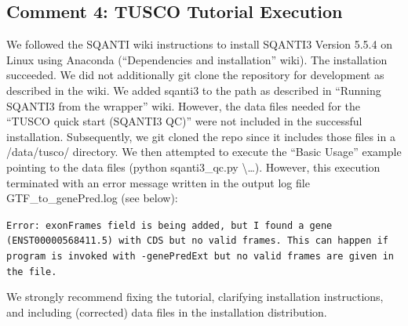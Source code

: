 \documentclass[11pt]{article}
\begin{document}
\subsection{Comment 4: TUSCO Tutorial Execution}

\begin{reviewercomment}
We followed the SQANTI wiki instructions to install SQANTI3 Version 5.5.4 on Linux using Anaconda (``Dependencies and installation'' wiki). The installation succeeded. We did not additionally git clone the repository for development as described in the wiki. We added sqanti3 to the path as described in ``Running SQANTI3 from the wrapper'' wiki. However, the data files needed for the ``TUSCO quick start (SQANTI3 QC)'' were not included in the successful installation. Subsequently, we git cloned the repo since it includes those files in a /data/tusco/ directory. We then attempted to execute the ``Basic Usage'' example pointing to the data files (python sqanti3\_qc.py \textbackslash{}\ldots). However, this execution terminated with an error message written in the output log file GTF\_to\_genePred.log (see below):

\smallskip
\texttt{Error: exonFrames field is being added, but I found a gene (ENST00000568411.5) with CDS but no valid frames. This can happen if program is invoked with -genePredExt but no valid frames are given in the file.}

\smallskip
We strongly recommend fixing the tutorial, clarifying installation instructions, and including (corrected) data files in the installation distribution.
\end{reviewercomment}
\end{document}
